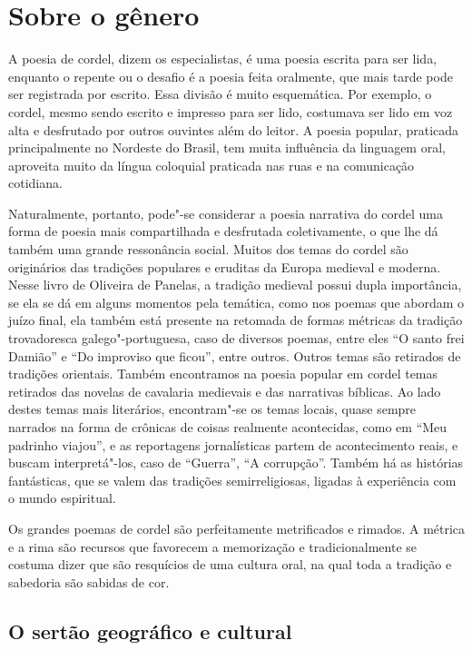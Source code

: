 \section{Sobre o gênero} 

A poesia de cordel, dizem os especialistas, é uma poesia escrita para
ser lida, enquanto o repente ou o desafio é a poesia feita oralmente,
que mais tarde pode ser registrada por escrito. Essa divisão é muito
esquemática. Por exemplo, o cordel, mesmo sendo escrito e impresso para
ser lido, costumava ser lido em voz alta e desfrutado por outros
ouvintes além do leitor. A poesia popular, praticada principalmente no
Nordeste do Brasil, tem muita influência da linguagem oral, aproveita
muito da língua coloquial praticada nas ruas e na comunicação
cotidiana. 

Naturalmente, portanto, pode"-se considerar a poesia narrativa do cordel
uma forma de poesia mais compartilhada e desfrutada coletivamente, o
que lhe dá também uma grande ressonância social. Muitos dos temas do
cordel são originários das tradições populares e eruditas da Europa
medieval e moderna. Nesse livro de Oliveira de Panelas, a tradição
medieval possui dupla importância, se ela se dá em alguns momentos pela
temática, como nos poemas que abordam o juízo final, ela também está
presente na retomada de formas métricas da tradição
trovadoresca galego"-portuguesa, caso de diversos poemas, entre eles
``O santo frei Damião'' e ``Do improviso que ficou'', entre
outros. Outros temas são retirados de tradições orientais. 
Também encontramos na poesia popular em cordel temas
retirados das novelas de cavalaria medievais e das narrativas bíblicas.
Ao lado destes temas mais literários, encontram"-se os temas locais,
quase sempre narrados na forma de crônicas de coisas realmente
acontecidas, como em ``Meu padrinho
viajou'', e as reportagens jornalísticas partem de
acontecimento reais, e buscam interpretá"-los, caso de
``Guerra'', ``A corrupção''. Também há as histórias fantásticas,
que se valem das tradições semirreligiosas, ligadas à experiência com o
mundo espiritual. 

Os grandes poemas de cordel são perfeitamente metrificados e rimados. A
métrica e a rima são recursos que favorecem a memorização e
tradicionalmente se costuma dizer que são resquícios de uma cultura
oral, na qual toda a tradição e sabedoria são sabidas de cor. 


\subsection{O sertão geográfico e cultural}

